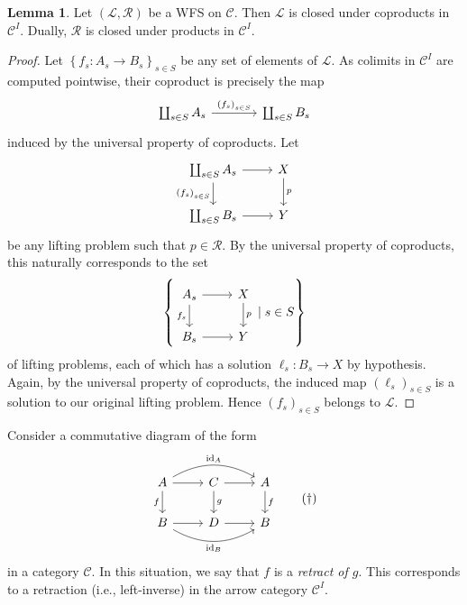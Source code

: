\documentclass[10pt,letterpaper,cm]{nupset}
\theoremstyle{definition}
\theoremstyle{theorem}
\newtheorem{lemma}[definition]{Lemma}
\theoremstyle{remark}
\renewcommand{\L}{\mathcal L}
\newcommand{\RI}{\mathcal R}
\newcommand{\0}{\mathbf{0}}
\newcommand{\1}{\mathbf{1}}
\newcommand{\2}{\mathbf{2}}
\renewcommand{\c}{\mathscr{C}}
\DeclareMathOperator{\idd}{id}
\begin{document}
\begin{lemma}\label{CC}
Let $\left(\L, \RI\right)$ be a WFS on $\c$. Then $\L$ is closed under coproducts in $\c^I$. Dually, $\RI$ is closed under products in $\c^I$.
\end{lemma}
\begin{proof}
Let $\left\{f_s : A_s \to B_s\right\}_{s\in S}$ be any set of elements of $\L$. As colimits in $\c^I$ are computed pointwise, their coproduct is precisely the map
\[
\begin{tikzcd}[column sep=large]
\coprod_{s\in S}A_s \arrow[r, "\left(f_s\right)_{s\in S}"] & \coprod_{s\in S}B_s
\end{tikzcd}
\] induced by the universal property of coproducts. Let
\[
\begin{tikzcd}
\coprod_{s\in S}A_s \arrow[r] \arrow[d, "\left(f_s\right)_{s\in S}"'] & X \arrow[d, "p"] \\
\coprod_{s\in S}B_s \arrow[r]                                         & Y               
\end{tikzcd}
\] be  any lifting problem such that $p\in \RI$. By the universal property of coproducts, this naturally corresponds to the set
\[
\left\{
\begin{tikzcd}
A_s \arrow[r] \arrow[d, "f_s"'] & X \arrow[d, "p"] \\
B_s \arrow[r]                                         & Y               
\end{tikzcd} \mid s\in S
\right\}
\] of lifting problems, each of which has  a solution $\ell_s: B_s \to X$ by hypothesis. Again, by the universal property of coproducts, the induced map $\left(\ell_s\right)_{s\in S}$ is a solution to our original lifting problem. Hence $\left(f_s\right)_{s\in S}$ belongs to $\L$.
\end{proof}

\medskip

Consider a commutative diagram of the form
\[ \label{eqn:ret}
\begin{tikzcd}
A \arrow[d, "f"'] \arrow[r] \arrow[rr, "\idd_A", bend left] & C \arrow[d, "g"] \arrow[r] & A \arrow[d, "f"] \\
B \arrow[r] \arrow[rr, "\idd_B"', bend right]               & D \arrow[r]                & B               
\end{tikzcd} \tag{$\dagger$}
\] in a category $\c$. In this situation, we say that $f$ is a \textit{retract of $g$}. This corresponds to a retraction (i.e., left-inverse) in the arrow category $\c^I$.

\smallskip
\end{document}
